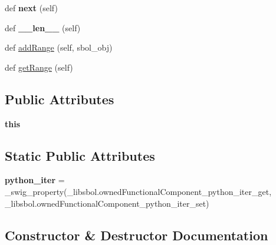 \begin{DoxyCompactItemize}
\item 
def {\bfseries next} (self)\hypertarget{classsbol_1_1libsbol_1_1owned_functional_component_ac23c5e9b4ae19686a8407624de22d02d}{}\label{classsbol_1_1libsbol_1_1owned_functional_component_ac23c5e9b4ae19686a8407624de22d02d}

\item 
def {\bfseries \+\_\+\+\_\+len\+\_\+\+\_\+} (self)\hypertarget{classsbol_1_1libsbol_1_1owned_functional_component_a75395607bdf31ab50bc5af8710efba52}{}\label{classsbol_1_1libsbol_1_1owned_functional_component_a75395607bdf31ab50bc5af8710efba52}

\item 
def \hyperlink{classsbol_1_1libsbol_1_1owned_functional_component_ac93e6c380b9fd17b91ebca3059dd36b1}{add\+Range} (self, sbol\+\_\+obj)
\item 
def \hyperlink{classsbol_1_1libsbol_1_1owned_functional_component_adfca3d62e9713250213c8ce5db9da51c}{get\+Range} (self)
\end{DoxyCompactItemize}
\subsection*{Public Attributes}
\begin{DoxyCompactItemize}
\item 
{\bfseries this}\hypertarget{classsbol_1_1libsbol_1_1owned_functional_component_a63f58981fe89901406e4c4e8e426fb72}{}\label{classsbol_1_1libsbol_1_1owned_functional_component_a63f58981fe89901406e4c4e8e426fb72}

\end{DoxyCompactItemize}
\subsection*{Static Public Attributes}
\begin{DoxyCompactItemize}
\item 
{\bfseries python\+\_\+iter} = \+\_\+swig\+\_\+property(\+\_\+libsbol.\+owned\+Functional\+Component\+\_\+python\+\_\+iter\+\_\+get, \+\_\+libsbol.\+owned\+Functional\+Component\+\_\+python\+\_\+iter\+\_\+set)\hypertarget{classsbol_1_1libsbol_1_1owned_functional_component_a3c48e8b39cd59dfca924c2549dd80656}{}\label{classsbol_1_1libsbol_1_1owned_functional_component_a3c48e8b39cd59dfca924c2549dd80656}

\end{DoxyCompactItemize}


\subsection{Constructor \& Destructor Documentation}
